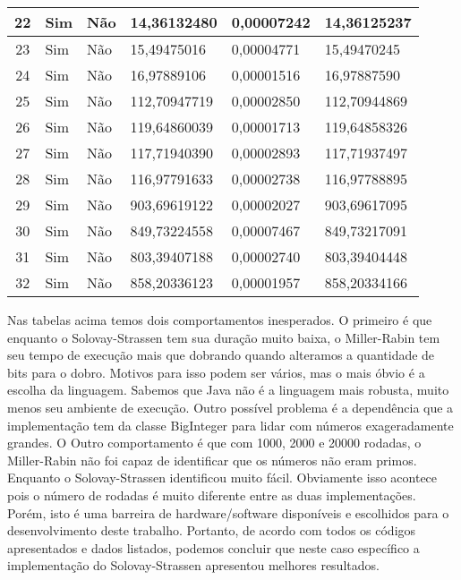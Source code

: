 \documentclass[openany]{ufsctex/ufsctex}
\begin{document}
\begin{longtable}{|c|p{1cm}|p{1cm}|p{2cm}|p{2cm}|p{2cm}|}
22 & Sim & Não & 14,36132480 & 0,00007242 & 14,36125237\\ \hline 
23 & Sim & Não & 15,49475016 & 0,00004771 & 15,49470245\\ \hline 
24 & Sim & Não & 16,97889106 & 0,00001516 & 16,97887590\\ \hline 
25 & Sim & Não & 112,70947719 & 0,00002850 & 112,70944869\\ \hline 
26 & Sim & Não & 119,64860039 & 0,00001713 & 119,64858326\\ \hline 
27 & Sim & Não & 117,71940390 & 0,00002893 & 117,71937497\\ \hline 
28 & Sim & Não & 116,97791633 & 0,00002738 & 116,97788895\\ \hline 
29 & Sim & Não & 903,69619122 & 0,00002027 & 903,69617095\\ \hline 
30 & Sim & Não & 849,73224558 & 0,00007467 & 849,73217091\\ \hline 
31 & Sim & Não & 803,39407188 & 0,00002740 & 803,39404448\\ \hline 
32 & Sim & Não & 858,20336123 & 0,00001957 & 858,20334166\\ \hline 

 \end{longtable}
	
	
	Nas tabelas acima temos dois comportamentos inesperados. O primeiro é que enquanto o Solovay-Strassen tem sua duração muito baixa, o Miller-Rabin tem seu tempo de execução mais que dobrando quando alteramos a quantidade de bits para o dobro. Motivos para isso podem ser vários, mas o mais óbvio é a escolha da linguagem. Sabemos que Java não é a linguagem mais robusta, muito menos seu ambiente de execução. Outro possível problema é a dependência que a implementação tem da classe BigInteger para lidar com números exageradamente grandes. O Outro comportamento é que com 1000, 2000 e 20000 rodadas, o Miller-Rabin não foi capaz de identificar que os números não eram primos. Enquanto o Solovay-Strassen identificou muito fácil. Obviamente isso acontece pois o número de rodadas é muito diferente entre as duas implementações. Porém, isto é uma barreira de hardware/software disponíveis e escolhidos para o desenvolvimento deste trabalho. Portanto, de acordo com todos os códigos apresentados e dados listados, podemos concluir que neste caso específico a implementação do Solovay-Strassen apresentou melhores resultados.
	
	
	 
\end{document}
